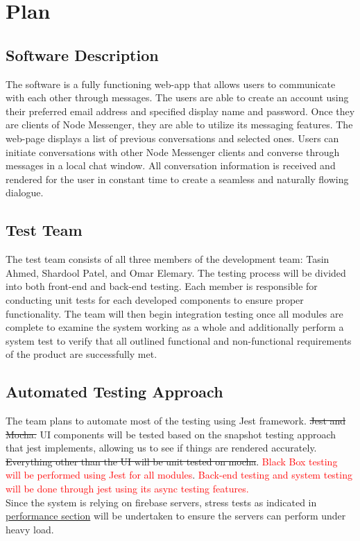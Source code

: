 \documentclass[12pt, titlepage]{article}
\begin{document}
\section{Plan}
	
\subsection{Software Description}
The software is a fully functioning web-app that allows users to communicate with each other through messages. The users are able to create an account using their preferred email address and specified display name and password. Once they are clients of Node Messenger, they are able to utilize its messaging features. The web-page displays a list of previous conversations and selected ones. Users can initiate conversations with other Node Messenger clients and converse through messages in a local chat window. All conversation information is received and rendered for the user in constant time to create a seamless and naturally flowing dialogue.

\subsection{Test Team}
The test team consists of all three members of the development team: Tasin Ahmed, Shardool Patel, and Omar Elemary. The testing process will be divided into both front-end and back-end testing. Each member is responsible for conducting unit tests for each developed components to ensure proper functionality. The team will then begin integration testing once all modules are complete to examine the system working as a whole and additionally perform a system test to verify that all outlined functional and non-functional requirements of the product are successfully met.

\subsection{Automated Testing Approach}

The team plans to automate most of the testing using Jest framework. \sout{Jest and Mocha.} UI components will be tested based on the snapshot testing approach that jest implements, allowing us to see if things are rendered accurately. \sout{Everything other than the UI will be unit tested on mocha}. \textcolor{red}{Black Box testing will be performed using Jest for all modules}. \textcolor{red}{Back-end testing and system testing will be done through jest using its async testing features.}\\
Since the system is relying on firebase servers, stress tests as indicated in \hyperref[sec:perf]{performance section} will be undertaken to ensure the servers can perform under heavy load. 
\end{document}
